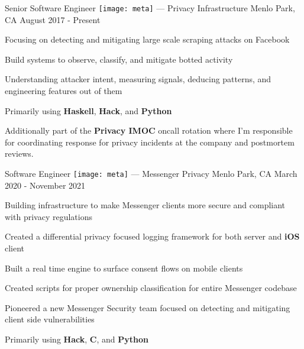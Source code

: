 


\begin{cventries}


\cventry
{Senior Software Engineer} %
{{\texttt{[image: meta]}} --- Privacy Infrastructure} %
{Menlo Park, CA} %
{August 2017 - Present} %
{ %
\begin{cvitems}
\item {Focusing on detecting and mitigating large scale scraping attacks on Facebook}
\item {Build systems to observe, classify, and mitigate botted activity}
\item {Understanding attacker intent, measuring signals, deducing patterns, and engineering features out of them}
\item {Primarily using \textbf{Haskell}, \textbf{Hack}, and \textbf{Python}}
\item {Additionally part of the \textbf{Privacy IMOC} oncall rotation where I'm responsible for coordinating response for privacy incidents at the company and postmortem reviews.}
\end{cvitems}
}


\cventry
{Software Engineer} %
{{\texttt{[image: meta]}} --- Messenger Privacy} %
{Menlo Park, CA} %
{March 2020 - November 2021} %
{ %
\begin{cvitems}
\item {Building infrastructure to make Messenger clients more secure and compliant with privacy regulations}
\item {Created a differential privacy focused logging framework for both server and \textbf{iOS} client}
\item {Built a real time engine to surface consent flows on mobile clients}
\item {Created scripts for proper ownership classification for entire Messenger codebase}
\item {Pioneered a new Messenger Security team focused on detecting and mitigating client side vulnerabilities}
\item {Primarily using \textbf{Hack}, \textbf{C}, and \textbf{Python}}
\end{cvitems}
}


\end{cventries}

